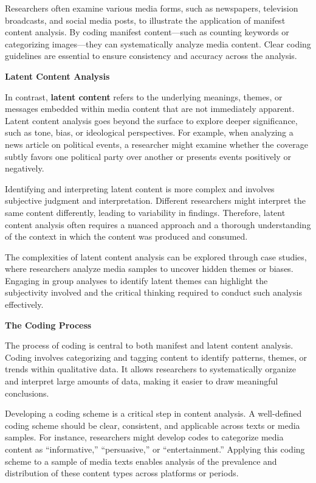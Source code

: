 \documentclass[
]{book}
\begin{document}
Researchers often examine various media forms, such as newspapers, television broadcasts, and social media posts, to illustrate the application of manifest content analysis. By coding manifest content---such as counting keywords or categorizing images---they can systematically analyze media content. Clear coding guidelines are essential to ensure consistency and accuracy across the analysis.

\textbf{Latent Content Analysis}

In contrast, \textbf{latent content} refers to the underlying meanings, themes, or messages embedded within media content that are not immediately apparent. Latent content analysis goes beyond the surface to explore deeper significance, such as tone, bias, or ideological perspectives. For example, when analyzing a news article on political events, a researcher might examine whether the coverage subtly favors one political party over another or presents events positively or negatively.

Identifying and interpreting latent content is more complex and involves subjective judgment and interpretation. Different researchers might interpret the same content differently, leading to variability in findings. Therefore, latent content analysis often requires a nuanced approach and a thorough understanding of the context in which the content was produced and consumed.

The complexities of latent content analysis can be explored through case studies, where researchers analyze media samples to uncover hidden themes or biases. Engaging in group analyses to identify latent themes can highlight the subjectivity involved and the critical thinking required to conduct such analysis effectively.

\textbf{The Coding Process}

The process of coding is central to both manifest and latent content analysis. Coding involves categorizing and tagging content to identify patterns, themes, or trends within qualitative data. It allows researchers to systematically organize and interpret large amounts of data, making it easier to draw meaningful conclusions.

Developing a coding scheme is a critical step in content analysis. A well-defined coding scheme should be clear, consistent, and applicable across texts or media samples. For instance, researchers might develop codes to categorize media content as ``informative,'' ``persuasive,'' or ``entertainment.'' Applying this coding scheme to a sample of media texts enables analysis of the prevalence and distribution of these content types across platforms or periods.
\end{document}
